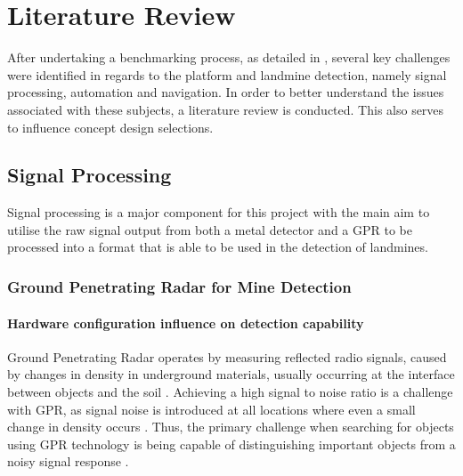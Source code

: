 \documentclass[main.tex]{subfiles}
\begin{document}
\chapter{Literature Review}
After undertaking a benchmarking process, as detailed in , several key challenges were identified in regards to the platform and landmine detection, namely signal processing, automation and navigation. In order to better understand the issues associated with these subjects, a literature review is conducted. This also serves to influence concept design selections. 

\section{Signal Processing}
Signal processing is a major component for this project with the main aim to utilise the raw signal output from both a metal detector and a GPR to be processed into a format that is able to be used in the detection of landmines.  
\subsection{Ground Penetrating Radar for Mine Detection}
\subsubsection{Hardware configuration influence on detection capability}
Ground Penetrating Radar operates by measuring reflected radio signals, caused by changes in density in underground materials, usually occurring at the interface between objects and the soil \parencite{sakaguchi2014}. Achieving a high signal to noise ratio is a challenge with GPR, as signal noise is introduced at all locations where even a small change in density occurs \parencite{shresta2003}. Thus, the primary challenge when searching for objects using GPR technology is being capable of distinguishing important objects from a noisy signal response \parencite{sakaguchi2014}.
\end{document}
